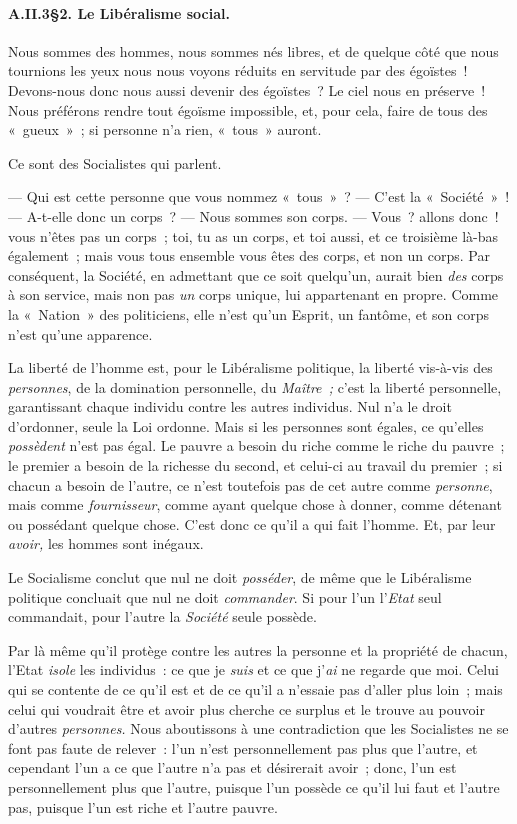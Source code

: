 \documentclass[french,twoside]{book} %
\begin{document}
\paragraph[{A.II.3§2. Le Libéralisme social.}]{A.II.3§2. Le Libéralisme social.}
\noindent Nous sommes des hommes, nous sommes nés libres, et de quelque côté que nous tournions les yeux nous nous voyons réduits en servitude par des égoïstes ! Devons-nous donc nous aussi devenir des égoïstes ? Le ciel nous en préserve ! Nous préférons rendre tout égoïsme impossible, et, pour cela, faire de tous des « gueux » ; si personne n’a rien, « tous » auront.\par
Ce sont des Socialistes qui parlent.\par
— Qui est cette personne que vous nommez « tous » ? — C’est la « Société » ! — A-t-elle donc un corps ? — Nous sommes son corps. — Vous ? allons donc ! vous n’êtes pas un corps ; toi, tu as un corps, et toi aussi, et ce troisième là-bas également ; mais vous tous ensemble vous êtes des corps, et non un corps. Par conséquent, la Société, en admettant que ce soit quelqu’un, aurait bien \emph{des} corps à son service, mais non pas \emph{un} corps unique, lui appartenant en propre. Comme la « Nation » des politiciens, elle n’est qu’un  Esprit, un fantôme, et son corps n’est qu’une apparence.\par
La liberté de l’homme est, pour le Libéralisme politique, la liberté vis-à-vis des \emph{personnes}, de la domination personnelle, du \emph{Maître ;} c’est la liberté personnelle, garantissant chaque individu contre les autres individus. Nul n’a le droit d’ordonner, seule la Loi ordonne. Mais si les personnes sont égales, ce qu’elles \emph{possèdent} n’est pas égal. Le pauvre a besoin du riche comme le riche du pauvre ; le premier a besoin de la richesse du second, et celui-ci au travail du premier ; si chacun a besoin de l’autre, ce n’est toutefois pas de cet autre comme \emph{personne}, mais comme \emph{fournisseur}, comme ayant quelque chose à donner, comme détenant ou possédant quelque chose. C’est donc ce qu’il a qui fait l’homme. Et, par leur \emph{avoir,} les hommes sont inégaux.\par
Le Socialisme conclut que nul ne doit \emph{posséder}, de même que le Libéralisme politique concluait que nul ne doit \emph{commander}. Si pour l’un l’\emph{Etat} seul commandait, pour l’autre la \emph{Société} seule possède.\par
Par là même qu’il protège contre les autres la personne et la propriété de chacun, l’Etat \emph{isole} les individus : ce que je \emph{suis} et ce que j’\emph{ai} ne regarde que moi. Celui qui se contente de ce qu’il est et de ce qu’il a n’essaie pas d’aller plus loin ; mais celui qui voudrait être et avoir plus cherche ce surplus et le trouve au pouvoir d’autres \emph{personnes.} Nous aboutissons à une contradiction que les Socialistes ne se font pas faute de relever : l’un n’est personnellement pas plus que l’autre, et cependant l’un a ce que l’autre n’a pas et désirerait avoir ; donc, l’un est personnellement plus que l’autre, puisque l’un possède ce qu’il lui faut et l’autre pas, puisque l’un est riche et l’autre pauvre.\par
\end{document}
